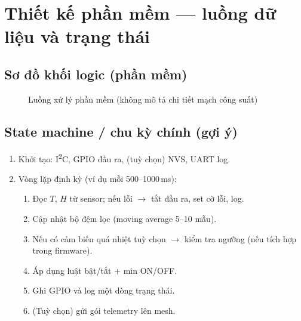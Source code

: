 \documentclass[12pt,a4paper]{report}
\begin{document}
\section{Thiết kế phần mềm --- luồng dữ liệu và trạng thái}

\subsection{Sơ đồ khối logic (phần mềm)}
\begin{figure}[H]
\centering
{}
\caption{Luồng xử lý phần mềm (không mô tả chi tiết mạch công suất)}
\label{fig:p1_sw_flow}
\end{figure}

\subsection{State machine / chu kỳ chính (gợi ý)}
\begin{enumerate}
  \item Khởi tạo: I\textsuperscript{2}C, GPIO đầu ra, (tuỳ chọn) NVS, UART log.
  \item Vòng lặp định kỳ (ví dụ mỗi 500--1000\,ms):
  \begin{enumerate}
    \item Đọc $T$, $H$ từ sensor; nếu lỗi $\rightarrow$ tắt đầu ra, set cờ lỗi, log.
    \item Cập nhật bộ đệm lọc (moving average 5--10 mẫu).
    \item Nếu có cảm biến quá nhiệt tuỳ chọn $\rightarrow$ kiểm tra ngưỡng (nếu tích hợp trong firmware).
    \item Áp dụng luật bật/tắt + min ON/OFF.
    \item Ghi GPIO và log một dòng trạng thái.
    \item (Tuỳ chọn) gửi gói telemetry lên mesh.
  \end{enumerate}
\end{enumerate}
\end{document}
